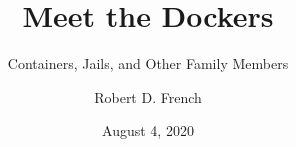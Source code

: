 \title{Meet the Dockers}
\subtitle{Containers, Jails, and Other Family Members}
\author{Robert D. French}
\date{August 4, 2020}
